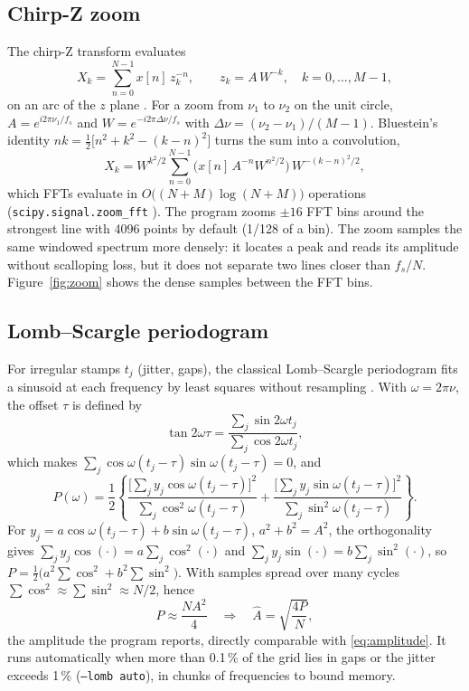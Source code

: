 \documentclass[10pt,letterpaper]{article}
\numberwithin{equation}{section}
\begin{document}
\subsection{Chirp-Z zoom}\label{sec:czt}
The chirp-Z transform evaluates
\begin{equation}
X_k = \sum_{n=0}^{N-1} x[n]\,z_k^{-n},\qquad z_k = A\,W^{-k},\quad k = 0,\dots,M-1,
\end{equation}
on an arc of the $z$ plane \cite{R12}. For a zoom from $\nu_1$ to $\nu_2$ on the
unit circle, $A = e^{i2\pi\nu_1/f_s}$ and $W = e^{-i2\pi\Delta\nu/f_s}$ with
$\Delta\nu = (\nu_2-\nu_1)/(M-1)$. Bluestein's identity
$nk = \tfrac12\big[n^2 + k^2 - (k-n)^2\big]$ \cite{B19} turns the sum into a
convolution,
\begin{equation}
X_k = W^{k^2/2}\sum_{n=0}^{N-1}\Big(x[n]\,A^{-n}W^{n^2/2}\Big)\,W^{-(k-n)^2/2},
\end{equation}
which FFTs evaluate in $O\big((N+M)\log(N+M)\big)$ operations
(\texttt{scipy.signal.zoom\_fft} \cite{B31}). The program zooms $\pm16$ FFT bins
around the strongest line with 4096 points by default (1/128 of a bin). The
zoom samples the same windowed spectrum more densely: it locates a peak and
reads its amplitude without scalloping loss, but it does not separate two lines
closer than $f_s/N$. Figure~\ref{fig:zoom} shows the dense samples between the
FFT bins.

\subsection{Lomb--Scargle periodogram}\label{sec:lomb}
For irregular stamps $t_j$ (jitter, gaps), the classical Lomb--Scargle
periodogram fits a sinusoid at each frequency by least squares without
resampling \cite{R13,R14}. With $\omega = 2\pi\nu$, the offset $\tau$ is defined by
\begin{equation}
\tan 2\omega\tau = \frac{\sum_j \sin 2\omega t_j}{\sum_j \cos 2\omega t_j},
\end{equation}
which makes $\sum_j \cos\omega(t_j-\tau)\sin\omega(t_j-\tau) = 0$, and
\begin{equation}
P(\omega) = \frac12\left\{\frac{\big[\sum_j y_j\cos\omega(t_j-\tau)\big]^2}{\sum_j\cos^2\omega(t_j-\tau)}
 + \frac{\big[\sum_j y_j\sin\omega(t_j-\tau)\big]^2}{\sum_j\sin^2\omega(t_j-\tau)}\right\}.
\end{equation}
For $y_j = a\cos\omega(t_j-\tau) + b\sin\omega(t_j-\tau)$, $a^2+b^2 = A^2$, the
orthogonality gives $\sum_j y_j\cos(\cdot) = a\sum_j\cos^2(\cdot)$ and
$\sum_j y_j\sin(\cdot) = b\sum_j\sin^2(\cdot)$, so
$P = \tfrac12\big(a^2\sum\cos^2 + b^2\sum\sin^2\big)$. With samples spread over
many cycles $\sum\cos^2 \approx \sum\sin^2 \approx N/2$, hence
\begin{equation}
P \approx \frac{N A^2}{4}\quad\Longrightarrow\quad \hat{A} = \sqrt{\frac{4P}{N}},
\end{equation}
the amplitude the program reports, directly comparable with \eqref{eq:amplitude}.
It runs automatically when more than 0.1\,\% of the grid lies in gaps or the
jitter exceeds 1\,\% (\texttt{--lomb auto}), in chunks of frequencies to bound
memory.
\end{document}

